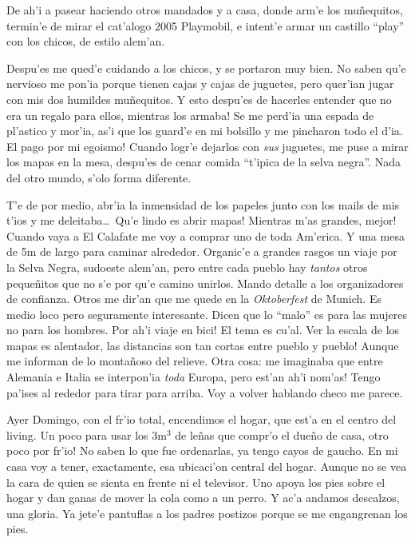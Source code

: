 De ah'i a pasear haciendo otros mandados y a casa, donde arm'e los mu\~nequitos,
termin'e de mirar el cat'alogo 2005 Playmobil, e intent'e armar un castillo
``play'' con los chicos, de estilo alem'an.

Despu'es me qued'e cuidando a los chicos, y se portaron muy bien. No saben qu'e
nervioso me pon'ia porque tienen cajas y cajas de juguetes, pero quer'ian jugar
con mis dos humildes mu\~nequitos. \textexclamdown Y esto despu'es de hacerles
entender que no era un regalo para ellos, mientras los armaba! Se me perd'ia una
espada de pl'astico y mor'ia, as'i que los guard'e en mi bolsillo y me pincharon
todo el d'ia. \textexclamdown El pago por mi egoismo! Cuando logr'e dejarlos con
\emph{sus} juguetes, me puse a mirar los mapas en la mesa, despu'es de cenar
comida ``t'ipica de la selva negra''. Nada del otro mundo, s'olo forma
diferente.

T'e de por medio, abr'ia la inmensidad de los papeles junto con los mails de mis
t'ios y me deleitaba\ldots\ \textexclamdown Qu'e lindo es abrir mapas!
\textexclamdown Mientras m'as grandes, mejor! Cuando vaya a El Calafate me voy a
comprar uno de toda Am'erica. Y una mesa de 5m de largo para caminar alrededor.
Organic'e a grandes rasgos un viaje por la Selva Negra, sudoeste alem'an, pero
entre cada pueblo hay \emph{tantos} otros peque\~nitos que no s'e por qu'e
camino unirlos. Mando detalle a los organizadores de confianza. Otros me dir'an
que me quede en la \emph{Oktoberfest} de Munich. Es medio loco pero seguramente
interesante. Dicen que lo ``malo'' es para las mujeres no para los hombres.
\textexclamdown Por ah'i viaje en bici! El tema es cu'al. Ver la escala de los
mapas es alentador, \textexclamdown las distancias son tan cortas entre pueblo y
pueblo! Aunque me informan de lo monta\~noso del relieve. Otra cosa: me
imaginaba que entre Alemania e Italia se interpon'ia \emph{toda} Europa,
\textexclamdown pero est'an ah'i nom'as! Tengo pa'ises al rededor para tirar
para arriba. Voy a volver hablando checo me parece.

Ayer Domingo, con el fr'io total, encendimos el hogar, que est'a en el centro
del living. \textexclamdown Un poco para usar los 3m$^3$ de le\~nas que compr'o
el due\~no de casa, otro poco por fr'io! No saben lo que fue ordenarlas, ya
tengo cayos de gaucho. En mi casa voy a tener, exactamente, esa ubicaci'on
central del hogar. Aunque no se vea la cara de quien se sienta en frente ni el
televisor. Uno apoya los pies sobre el hogar y dan ganas de mover la cola como a
un perro. Y ac'a andamos descalzos, una gloria. Ya jete'e pantuflas a los padres
postizos porque se me engangrenan los pies.

